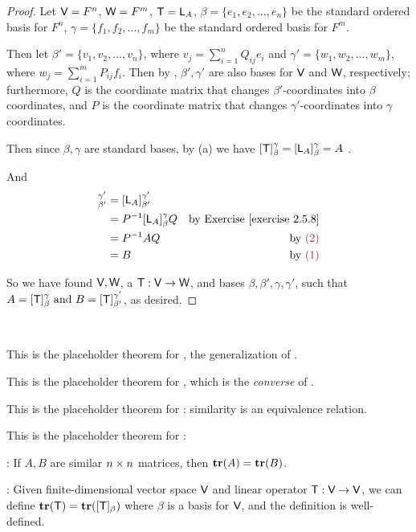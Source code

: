 \begin{proof}
Let \(\textsf{V} = F^n\), \(\textsf{W} = F^m\), \(\textsf{T} = \textsf{L}_A\), \(\beta = \{ e_1, e_2, ..., e_n \}\) be the standard ordered basis for \(F^n\), \(\gamma = \{ f_1, f_2, ..., f_m \}\) be the standard ordered basis for \(F^m\).

Then let \(\beta' = \{ v_1, v_2, ..., v_n \}\), where \(v_j = \sum_{i = 1}^n Q_{ij} e_i\) and \(\gamma' = \{ w_1, w_2, ..., w_m \}\), where \(w_j = \sum_{i = 1}^m P_{ij} f_i\).
Then by , \(\beta', \gamma'\) are also bases for \(\textsf{V}\) and \(\textsf{W}\), respectively;
furthermore, \(Q\) is the coordinate matrix that changes \(\beta'\)-coordinates into \(\beta\) coordinates,
and \(P\) is the coordinate matrix that changes \(\gamma'\)-coordinates into \(\gamma\) coordinates.

Then since \(\beta, \gamma\) are standard bases, by (a) we have \([\textsf{T}]_{\beta}^{\gamma} = [\textsf{L}_A]_{\beta}^{\gamma} = A\) .

And
\begin{align*}
    [\T]_{\beta'}^{\gamma'}
        & = [\LMTRAN_A]_{\beta'}^{\gamma'} \\
        & = P^{-1} [\LMTRAN_A]_{\beta}^{\gamma} Q & \text{by \EXEC{2.5.8}} \\
        & = P^{-1} A Q & \text{by \MAROON{(2)}} \\
        & = B & \text{by \MAROON{(1)}}
\end{align*}

So we have found \(\textsf{V}, \textsf{W}\), a \LTRAN{} \(\textsf{T} : \textsf{V} \to \textsf{W}\), and bases \(\beta, \beta', \gamma, \gamma'\), such that \(A = [\textsf{T}]_{\beta}^{\gamma} \text{ and } B = [\textsf{T}]_{\beta'}^{\gamma'}\), as desired.
\end{proof}

\begin{additional theorem} \label{athm 2.46} \ 

 This is the placeholder theorem for , the generalization of .

 This is the placeholder theorem for , which is the \emph{converse} of .
\end{additional theorem}

\begin{additional theorem} \label{athm 2.47}
This is the placeholder theorem for : similarity is an equivalence relation.
\end{additional theorem}

\begin{additional theorem} \label{athm 2.48}
This is the placeholder theorem for :

: If \(A, B\) are similar \(n \times n\) matrices, then \(\textbf{tr}(A) = \textbf{tr}(B)\).

: Given finite-dimensional vector space \(\textsf{V}\) and linear operator \(\textsf{T} : \textsf{V} \to \textsf{V}\), we can define \(\textbf{tr}(\textsf{T}) = \textbf{tr}([\textsf{T}]_{\beta})\) where \(\beta\) is a basis for \(\textsf{V}\), and the definition is well-defined.
\end{additional theorem}

